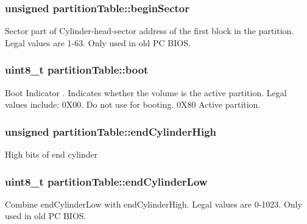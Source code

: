 \subsubsection[{\texorpdfstring{begin\+Sector}{beginSector}}]{\setlength{\rightskip}{0pt plus 5cm}unsigned partition\+Table\+::begin\+Sector}\hypertarget{structpartition_table_ae201c11d9671c9efc307c654a2b6c026}{}\label{structpartition_table_ae201c11d9671c9efc307c654a2b6c026}
Sector part of Cylinder-\/head-\/sector address of the first block in the partition. Legal values are 1-\/63. Only used in old PC B\+I\+OS. 
\subsubsection[{\texorpdfstring{boot}{boot}}]{\setlength{\rightskip}{0pt plus 5cm}uint8\+\_\+t partition\+Table\+::boot}\hypertarget{structpartition_table_adf386afb1f33046d8b6a1a0afa780ec9}{}\label{structpartition_table_adf386afb1f33046d8b6a1a0afa780ec9}
Boot Indicator . Indicates whether the volume is the active partition. Legal values include\+: 0\+X00. Do not use for booting. 0\+X80 Active partition. 
\subsubsection[{\texorpdfstring{end\+Cylinder\+High}{endCylinderHigh}}]{\setlength{\rightskip}{0pt plus 5cm}unsigned partition\+Table\+::end\+Cylinder\+High}\hypertarget{structpartition_table_a32fea225b8ffd925ad919ffc56e9abda}{}\label{structpartition_table_a32fea225b8ffd925ad919ffc56e9abda}
High bits of end cylinder 
\subsubsection[{\texorpdfstring{end\+Cylinder\+Low}{endCylinderLow}}]{\setlength{\rightskip}{0pt plus 5cm}uint8\+\_\+t partition\+Table\+::end\+Cylinder\+Low}\hypertarget{structpartition_table_ad7829e34be70084abe145227b0d18274}{}\label{structpartition_table_ad7829e34be70084abe145227b0d18274}
Combine end\+Cylinder\+Low with end\+Cylinder\+High. Legal values are 0-\/1023. Only used in old PC B\+I\+OS. 
